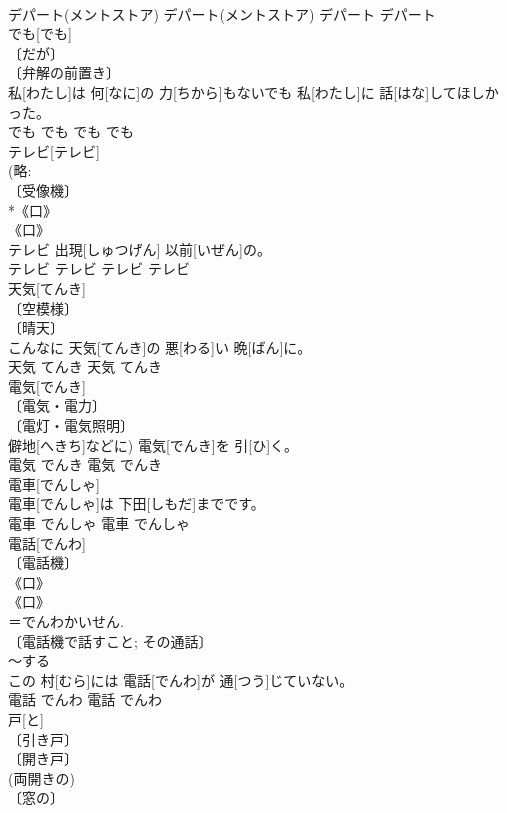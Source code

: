 \documentclass[8pt]{extreport}
\begin{document}
\begin{CJK}{UTF8}{min}
\\	デパート(メントストア)	デパート(メントストア)	デパート	デパート	
\\	でも[でも]	
\\	〔だが〕 
\\	〔弁解の前置き〕 
\\	私[わたし]は 何[なに]の 力[ちから]もないでも 私[わたし]に 話[はな]してほしかった。	
\\	でも	でも	でも	でも	
\\	テレビ[テレビ]	
\\	(略: 
\\	〔受像機〕 
\\	*《口》 
\\	《口》 
\\	テレビ 出現[しゅつげん] 以前[いぜん]の。	
\\	テレビ	テレビ	テレビ	テレビ	
\\	天気[てんき]	
\\	〔空模様〕 
\\	〔晴天〕 
\\	こんなに 天気[てんき]の 悪[わる]い 晩[ばん]に。	
\\	天気	てんき	天気	てんき	
\\	電気[でんき]	
\\	〔電気・電力〕 
\\	〔電灯・電気照明〕 
\\	僻地[へきち]などに) 電気[でんき]を 引[ひ]く。	
\\	電気	でんき	電気	でんき	
\\	電車[でんしゃ]	
\\	電車[でんしゃ]は 下田[しもだ]までです。	
\\	電車	でんしゃ	電車	でんしゃ	
\\	電話[でんわ]	
\\	〔電話機〕 
\\	《口》 
\\	《口》 
\\	＝でんわかいせん. 
\\	〔電話機で話すこと; その通話〕 
\\	～する 
\\	この 村[むら]には 電話[でんわ]が 通[つう]じていない。	
\\	電話	でんわ	電話	でんわ	
\\	戸[と]	
\\	〔引き戸〕 
\\	〔開き戸〕 
\\	(両開きの) 
\\	〔窓の〕 

\end{CJK}
\end{document}
